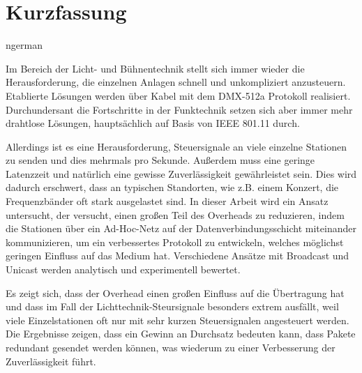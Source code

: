\documentclass[]{ccs-thesis}
\begin{document}
\chapter*{Kurzfassung}
\begin{otherlanguage*}{ngerman}

Im Bereich der Licht- und Bühnentechnik stellt sich immer wieder die Herausforderung, 
die einzelnen Anlagen schnell und unkompliziert anzusteuern. 
Etablierte Lösungen werden über Kabel mit dem DMX-512a Protokoll realisiert. 
Durchundersant die Fortschritte in der Funktechnik setzen sich aber immer mehr drahtlose Lösungen, 
hauptsächlich auf Basis von IEEE 801.11 durch. 

Allerdings ist es eine Herausforderung, Steuersignale an viele einzelne Stationen zu senden 
und dies mehrmals pro Sekunde.
Außerdem muss eine geringe Latenzzeit und natürlich eine gewisse Zuverlässigkeit gewährleistet sein.
Dies wird dadurch erschwert, dass an typischen Standorten, wie z.B. einem Konzert, 
die Frequenzbänder oft stark ausgelastet sind. 
In dieser Arbeit wird ein Ansatz untersucht, der versucht, einen großen Teil des Overheads zu reduzieren,
indem die Stationen über ein Ad-Hoc-Netz auf der Datenverbindungsschicht miteinander kommunizieren,
um ein verbessertes Protokoll zu entwickeln, welches möglichst geringen Einfluss auf das Medium hat.
Verschiedene Ansätze mit Broadcast und Unicast werden analytisch und experimentell bewertet.

Es zeigt sich, dass der Overhead einen großen Einfluss auf die Übertragung hat 
und dass im Fall der Lichttechnik-Steursignale besonders extrem ausfällt,
weil viele Einzelstationen oft nur mit sehr kurzen Steuersignalen angesteuert werden.
Die Ergebnisse zeigen, dass ein Gewinn an Durchsatz bedeuten kann, 
dass Pakete redundant gesendet werden können,
was wiederum zu einer Verbesserung der Zuverlässigkeit führt.

\end{otherlanguage*}
\acresetall

\cleardoublepage
\tableofcontents

\cleardoublepage
{}












% 

\cleardoublepage

\listofabbreviations
\clearpage

\listoffigures
\clearpage

\listoftables
\clearpage

\lstlistoflistings
\clearpage

\printbibliography
\end{document}
